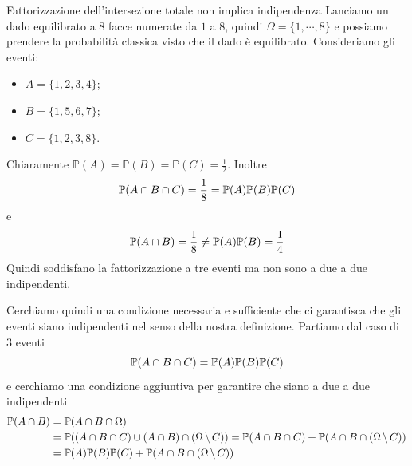 \documentclass[a4paper]{article}
\begin{document}
\begin{snippetexample}{Fattorizzazione dell'intersezione totale non implica indipendenza}
    Lanciamo un dado equilibrato a \(8\) facce numerate da \(1\) a \(8\),
    quindi \(\Omega = \{1, \cdots, 8\}\) e possiamo prendere la probabilità classica visto che il dado è equilibrato.
    Consideriamo gli eventi:
    \begin{itemize}
        \item \(A = \{1,2,3,4\}\);
        \item \(B = \{1,5,6,7\}\);
        \item \(C = \{1,2,3,8\}\).
    \end{itemize}
    Chiaramente \(\mathbb P(A) = \mathbb P(B) = \mathbb P(C) = \frac12\).
    Inoltre
    \[
        \mathbb P(A \cap B \cap C) = \frac18 = \mathbb P(A)\mathbb P(B)\mathbb P(C)
    \]
    e \[
        \mathbb P(A \cap B) = \frac18 \neq \mathbb P(A)\mathbb P(B) = \frac14
    \]
    Quindi soddisfano la fattorizzazione a tre eventi ma non sono a due a due indipendenti.
\end{snippetexample}

Cerchiamo quindi una condizione necessaria e sufficiente che ci garantisca che gli eventi
siano indipendenti nel senso della nostra definizione. Partiamo dal caso di \(3\)
eventi \[
    \mathbb P(A\cap B \cap C) = \mathbb P(A)\mathbb P(B)\mathbb P(C)
\]
e cerchiamo una condizione aggiuntiva per garantire che siano a due a due indipendenti
\begin{align*}
    \mathbb P(A\cap B) &=
    \mathbb P(A \cap B \cap \Omega) \\
    &= \mathbb P((A \cap B \cap C) \cup (A \cap B) \cap (\Omega \,\backslash\, C))
    = \mathbb P(A \cap B \cap C) + \mathbb P(A \cap B \cap (\Omega \,\backslash\, C)) \\
    &= \mathbb P(A)\mathbb P(B)\mathbb P(C) + \mathbb P(A \cap B \cap (\Omega \,\backslash\, C))
\end{align*}
\end{document}
